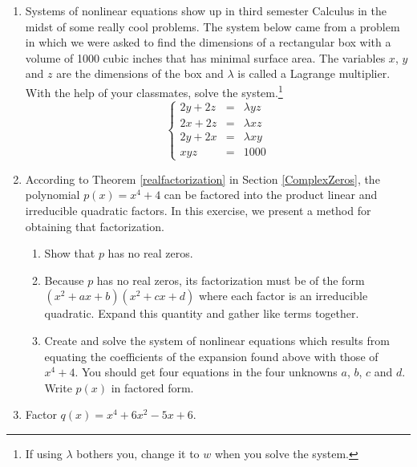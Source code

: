 \begin{enumerate}
\setcounter{enumi}{\value{HW}}


\item Systems of nonlinear equations show up in third semester Calculus in the midst of some really cool problems.  The system below came from a problem in which we were asked to find the dimensions of a rectangular box with a volume of 1000 cubic inches that has minimal surface area.  The variables $x$, $y$ and $z$ are the dimensions of the box and $\lambda$ is called a Lagrange multiplier.  With the help of your classmates, solve the system.\footnote{If using $\lambda$ bothers you, change it to $w$ when you solve the system.} \[\left\{\begin{array}{rcr}  2y + 2z & = & \lambda yz  \\ 2x + 2z & = & \lambda xz \\ 2y + 2x & = & \lambda xy \\ xyz & = & 1000 \end{array} \right.\]

\item According to Theorem \ref{realfactorization} in Section \ref{ComplexZeros}, the polynomial $p(x) = x^{4} + 4$ can be factored into the product linear and irreducible quadratic factors.  In this exercise, we present a method for obtaining that factorization.  
\label{factorpolywithnonlinear}

\begin{enumerate}

\item Show that $p$ has no real zeros.  

\item Because $p$ has no real zeros, its factorization must be of the form $(x^{2} + ax + b)(x^{2} + cx + d)$ where each factor is an irreducible quadratic.  Expand this quantity and gather like terms together.

\item Create and solve the system of nonlinear equations which results from equating the coefficients of the expansion found above with those of $x^{4} + 4$.  You should get four equations in the four unknowns $a$, $b$, $c$ and $d$.  Write $p(x)$ in factored form.

\end{enumerate}

\item Factor $q(x) = x^{4} + 6x^{2} - 5x + 6$.

\end{enumerate}

